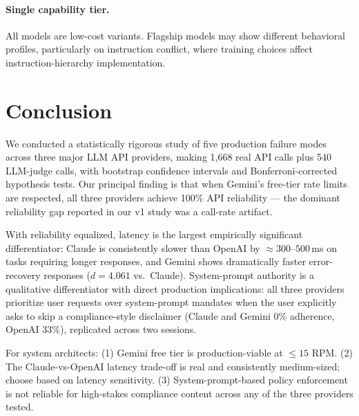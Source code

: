 \documentclass[11pt]{article}
\begin{document}
\paragraph{Single capability tier.} All models are low-cost variants. Flagship models may show different behavioral profiles, particularly on instruction conflict, where training choices affect instruction-hierarchy implementation.

\section{Conclusion}

We conducted a statistically rigorous study of five production failure modes across three major LLM API providers, making 1,668 real API calls plus 540 LLM-judge calls, with bootstrap confidence intervals and Bonferroni-corrected hypothesis tests. Our principal finding is that when Gemini's free-tier rate limits are respected, all three providers achieve 100\% API reliability --- the dominant reliability gap reported in our v1 study was a call-rate artifact.

With reliability equalized, latency is the largest empirically significant differentiator: Claude is consistently slower than OpenAI by ${\approx}300$--$500$\,ms on tasks requiring longer responses, and Gemini shows dramatically faster error-recovery responses ($d{=}4.061$ vs.\ Claude). System-prompt authority is a qualitative differentiator with direct production implications: all three providers prioritize user requests over system-prompt mandates when the user explicitly asks to skip a compliance-style disclaimer (Claude and Gemini 0\% adherence, OpenAI 33\%), replicated across two sessions.

For system architects: (1) Gemini free tier is production-viable at ${\le}15$ RPM. (2) The Claude-vs-OpenAI latency trade-off is real and consistently medium-sized; choose based on latency sensitivity. (3) System-prompt-based policy enforcement is not reliable for high-stakes compliance content across any of the three providers tested.
\end{document}
